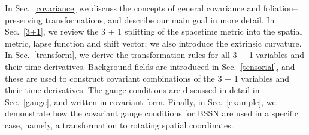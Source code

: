 \documentclass[letterpaper,nofootinbib,prd,amsmath,onecolumn]{revtex4-1}
\begin{document}
In Sec.~\ref{covariance} we discuss the concepts of general covariance and foliation--preserving transformations, and describe our main goal in more detail. 
In Sec.~\ref{3+1}, we review the 3 + 1 splitting of the spacetime metric into the spatial metric, lapse function and shift vector; 
we also introduce the extrinsic curvature. 
In Sec.~\ref{transform}, we derive the transformation rules for all 3 + 1 variables and their time derivatives. 
Background fields are introduced in Sec.~\ref{tensorial}, and these are used to construct covariant combinations of the 3 + 1 variables and their time derivatives. 
The gauge conditions are discussed in detail in Sec.~\ref{gauge}, and written in covariant form. 
Finally, in Sec.~\ref{example}, we demonstrate how the covariant gauge conditions for BSSN are used in a specific case, namely, a transformation 
to rotating spatial coordinates. 


\end{document}
